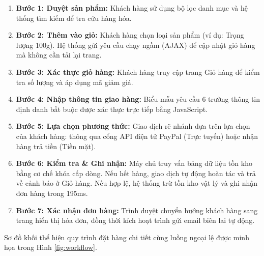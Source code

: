 \begin{enumerate}
    \item \textbf{Bước 1: Duyệt sản phẩm:} Khách hàng sử dụng bộ lọc danh mục và hệ thống tìm kiếm để tra cứu hàng hóa.
    \item \textbf{Bước 2: Thêm vào giỏ:} Khách hàng chọn loại sản phẩm (ví dụ: Trọng lượng 100g). Hệ thống gửi yêu cầu chạy ngầm (AJAX) để cập nhật giỏ hàng mà không cần tải lại trang.
    \item \textbf{Bước 3: Xác thực giỏ hàng:} Khách hàng truy cập trang Giỏ hàng để kiểm tra số lượng và áp dụng mã giảm giá.
    \item \textbf{Bước 4: Nhập thông tin giao hàng:} Biểu mẫu yêu cầu 6 trường thông tin định danh bắt buộc được xác thực trực tiếp bằng JavaScript.
    \item \textbf{Bước 5: Lựa chọn phương thức:} Giao dịch rẽ nhánh dựa trên lựa chọn của khách hàng: thông qua cổng API điện tử PayPal (Trực tuyến) hoặc nhận hàng trả tiền (Tiền mặt).
    \item \textbf{Bước 6: Kiểm tra \& Ghi nhận:} Máy chủ truy vấn bảng dữ liệu tồn kho bằng cơ chế khóa cấp dòng. Nếu hết hàng, giao dịch tự động hoàn tác và trả về cảnh báo ở Giỏ hàng. Nếu hợp lệ, hệ thống trừ tồn kho vật lý và ghi nhận đơn hàng trong 195ms.
    \item \textbf{Bước 7: Xác nhận đơn hàng:} Trình duyệt chuyển hướng khách hàng sang trang hiển thị hóa đơn, đồng thời kích hoạt trình gửi email biên lai tự động.
\end{enumerate}

Sơ đồ khối thể hiện quy trình đặt hàng chi tiết cùng luồng ngoại lệ được minh họa trong Hình \ref{fig:workflow}. 

